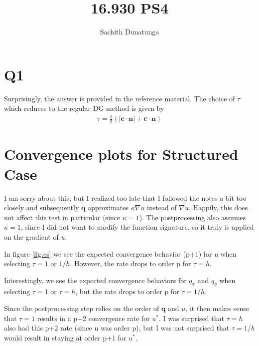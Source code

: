 \documentclass{article}
\begin{document}
\author{Sachith Dunatunga}
\title{16.930 PS4}
\maketitle

\section{Q1}
Surprisingly, the answer is provided in the reference material\cite{nguyen}.
The choice of $\tau$ which reduces to the regular DG method is given by
\begin{align}
\tau = \frac{1}{2} \left( | \mathbf{c} \cdot \mathbf{n} | + \mathbf{c} \cdot \mathbf{n} \right)
\end{align}

\section{Convergence plots for Structured Case}
I am sorry about this, but I realized too late that I followed the notes a bit too closely and subsequently $\mathbf{q}$ approximates $\kappa \nabla u$ instead of $\nabla u$.
Happily, this does not affect this test in particular (since $\kappa = 1$).
The postprocessing also assumes $\kappa = 1$, since I did not want to modify the function signature, so it truly is applied on the gradient of $u$.

In figure \ref{fig:cs} we see the expected convergence behavior (p+1) for u when selecting $\tau = 1$ or $1/h$.
However, the rate drops to order p for $\tau = h$.

Interestingly, we see the expected convergence behaviors for $q_x$ and $q_y$ when selecting $\tau = 1$ or $\tau = h$, but the rate drops to order p for $\tau = 1/h$.

Since the postprocessing step relies on the order of $\mathbf{q}$ and $u$, it then makes sense that $\tau = 1$ results in a p+2 convergence rate for $u^*$. I was surprised that $\tau = h$ also had this p+2 rate (since u was order p), but I was not surprised that $\tau = 1/h$ would result in staying at order p+1 for $u^*$.
\end{document}
